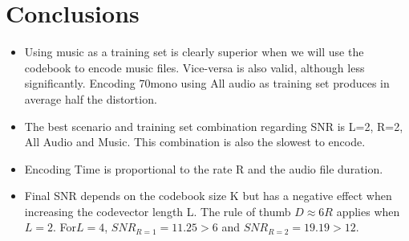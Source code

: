 \documentclass[a4paper, 11pt]{article}
\begin{document}
	\section{Conclusions}
		\begin{itemize}
			\item Using music as a training set is clearly superior when we will use the codebook to encode music files. Vice-versa is also valid, although less significantly. Encoding 70mono using All audio as training set produces in average half the distortion.
			\item The best scenario and training set combination regarding SNR is L=2, R=2, All Audio and Music. This combination is also the slowest to encode.
			\item Encoding Time is proportional to the rate R and the audio file duration.
			\item Final SNR depends on the codebook size K but has a negative effect when increasing the codevector length L. The rule of thumb $D \approx 6R$ applies when $ L =2 $. For$  L=4 $, $ SNR_{R=1} = 11.25 > 6 $ and $ SNR_{R=2} = 19.19 > 12 $.
		\end{itemize}	
		
		
\end{document}
